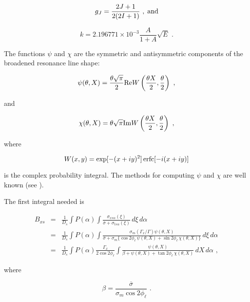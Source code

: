 \begin{equation}
   g_J=\frac{2J+1}{2(2I+1)}\,\,,\;\hbox{and}
\end{equation}

\begin{equation}
   k = 2.196771\times 10^{-3}\frac{A}{1+A}\sqrt{E}\,\,.
\end{equation}

\noindent
The functions $\psi$ and $\chi$ are the symmetric and antisymmetric
components of the broadened resonance line shape:

\begin{equation}
   \psi(\theta,X) = \frac{\theta\sqrt{\pi}}{2}
    {\rm Re}W\left(\frac{\theta X}{2},\frac{\theta}{2}\right)\,\,,
\end{equation}

\noindent
and

\begin{equation}
   \chi(\theta,X) = \theta\sqrt{\pi} {\rm Im}W\left(
      \frac{\theta X}{2},\frac{\theta}{2}\right)\,\,,
\end{equation}

\noindent
where

\begin{equation}
   W(x,y) = {\rm exp}[-(x+iy)^2]\,{\rm erfc}[-i(x+iy)]
\end{equation}

\noindent
is the complex probability integral.  The methods for computing
$\psi$ and $\chi$ are well known (see ).

The first integral needed is

\begin{eqnarray}
   B_{xs} &=& \frac{1}{D_s}\int P(\alpha)\int
   \frac{\sigma_{xs\alpha}(\xi)}
        {\overline{\sigma}+\sigma_{ts\alpha}(\xi)}
           \,d\xi\,d\alpha \nonumber\\
   &=& \frac{1}{D_s}\int P(\alpha)\int
      \frac{\sigma_m (\Gamma_x/\Gamma)\psi(\theta,X)}
       {\overline{\sigma}+\sigma_m\{\cos 2\phi_\ell\, \psi(\theta,X)
           +\sin 2\phi_\ell\,\chi(\theta,X)\}}
            \,d\xi\,d\alpha \nonumber\\
   &=& \frac{1}{D_s}\int P(\alpha) \frac{\Gamma_x}{2\cos 2\phi_\ell}
       \int \frac{\psi(\theta,X)}
       {\beta+\psi(\theta,X)+\tan 2\phi_\ell\,\chi(\theta,X)}
        \,dX\,d\alpha\,\,,
\end{eqnarray}

\noindent
where

\begin{equation}
   \beta=\frac{\overline{\sigma}}{\sigma_m\cos 2\phi_\ell}\,\,.
\end{equation}

